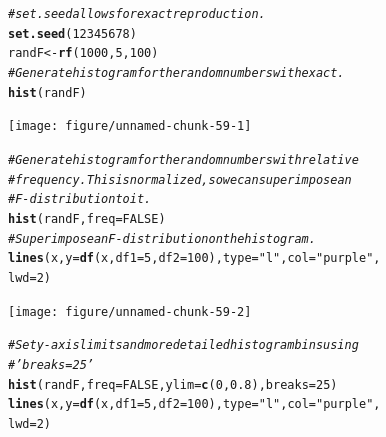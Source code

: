 \documentclass[oneside]{book}\usepackage[]{graphicx}\usepackage[dvipsnames,table,xcdraw]{xcolor}
\makeatletter
\newcommand{\hlnum}[1]{\textcolor[rgb]{0.686,0.059,0.569}{#1}}%
\newcommand{\hlstr}[1]{\textcolor[rgb]{0.192,0.494,0.8}{#1}}%
\newcommand{\hlcom}[1]{\textcolor[rgb]{0.678,0.584,0.686}{\textit{#1}}}%
\newcommand{\hlstd}[1]{\textcolor[rgb]{0.345,0.345,0.345}{#1}}%
\newcommand{\hlkwb}[1]{\textcolor[rgb]{0.69,0.353,0.396}{#1}}%
\newcommand{\hlkwc}[1]{\textcolor[rgb]{0.333,0.667,0.333}{#1}}%
\newcommand{\hlkwd}[1]{\textcolor[rgb]{0.737,0.353,0.396}{\textbf{#1}}}%
\newenvironment{kframe}{%
 \def\at@end@of@kframe{}%
 \ifinner\ifhmode%
  \def\at@end@of@kframe{\end{minipage}}%
  \begin{minipage}{\columnwidth}%
 \fi\fi%
 \def\FrameCommand##1{\hskip\@totalleftmargin \hskip-\fboxsep
 \colorbox{shadecolor}{##1}\hskip-\fboxsep
     \hskip-\linewidth \hskip-\@totalleftmargin \hskip\columnwidth}%
 \MakeFramed {\advance\hsize-\width
   \@totalleftmargin\z@ \linewidth\hsize
   \@setminipage}}%
 {\par\unskip\endMakeFramed%
 \at@end@of@kframe}
\newenvironment{knitrout}{}{} %
\makeatother
\begin{document}
\begin{knitrout}
\color{fgcolor}\begin{kframe}
\begin{alltt}
\hlcom{# set.seed allows for exact reproduction.}
\hlkwd{set.seed}\hlstd{(}\hlnum{12345678}\hlstd{)}
\hlstd{randF} \hlkwb{<-} \hlkwd{rf}\hlstd{(}\hlnum{1000}\hlstd{,} \hlnum{5}\hlstd{,} \hlnum{100}\hlstd{)}
\hlcom{# Generate histogram for the random numbers with exact.}
\hlkwd{hist}\hlstd{(randF)}
\end{alltt}
\end{kframe}

{\centering \texttt{[image: figure/unnamed-chunk-59-1]} 

}


\begin{kframe}\begin{alltt}
\hlcom{# Generate histogram for the random numbers with relative}
\hlcom{# frequency.  This is normalized, so we can superimpose an}
\hlcom{# F-distribution to it.}
\hlkwd{hist}\hlstd{(randF,} \hlkwc{freq} \hlstd{=} \hlnum{FALSE}\hlstd{)}
\hlcom{# Superimpose an F-distribution on the histogram.}
\hlkwd{lines}\hlstd{(x,} \hlkwc{y} \hlstd{=} \hlkwd{df}\hlstd{(x,} \hlkwc{df1} \hlstd{=} \hlnum{5}\hlstd{,} \hlkwc{df2} \hlstd{=} \hlnum{100}\hlstd{),} \hlkwc{type} \hlstd{=} \hlstr{"l"}\hlstd{,} \hlkwc{col} \hlstd{=} \hlstr{"purple"}\hlstd{,}
  \hlkwc{lwd} \hlstd{=} \hlnum{2}\hlstd{)}
\end{alltt}
\end{kframe}

{\centering \texttt{[image: figure/unnamed-chunk-59-2]} 

}


\begin{kframe}\begin{alltt}
\hlcom{# Set y-axis limits and more detailed histogram bins using}
\hlcom{# 'breaks = 25'}
\hlkwd{hist}\hlstd{(randF,} \hlkwc{freq} \hlstd{=} \hlnum{FALSE}\hlstd{,} \hlkwc{ylim} \hlstd{=} \hlkwd{c}\hlstd{(}\hlnum{0}\hlstd{,} \hlnum{0.8}\hlstd{),} \hlkwc{breaks} \hlstd{=} \hlnum{25}\hlstd{)}
\hlkwd{lines}\hlstd{(x,} \hlkwc{y} \hlstd{=} \hlkwd{df}\hlstd{(x,} \hlkwc{df1} \hlstd{=} \hlnum{5}\hlstd{,} \hlkwc{df2} \hlstd{=} \hlnum{100}\hlstd{),} \hlkwc{type} \hlstd{=} \hlstr{"l"}\hlstd{,} \hlkwc{col} \hlstd{=} \hlstr{"purple"}\hlstd{,}
  \hlkwc{lwd} \hlstd{=} \hlnum{2}\hlstd{)}
\end{alltt}
\end{kframe}


\end{knitrout}
\end{document}
